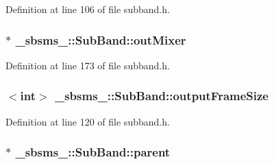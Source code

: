 Definition at line 106 of file subband.\+h.

\subsubsection[{\texorpdfstring{out\+Mixer}{outMixer}}]{$\ast$ \+\_\+sbsms\+\_\+\+::\+Sub\+Band\+::out\+Mixer\hspace{0.3cm}{\ttfamily [protected]}}\hypertarget{class__sbsms___1_1_sub_band_a7abca964a57ef44320053c850ad57803}{}\label{class__sbsms___1_1_sub_band_a7abca964a57ef44320053c850ad57803}


Definition at line 173 of file subband.\+h.

\subsubsection[{\texorpdfstring{output\+Frame\+Size}{outputFrameSize}}]{$<${\bf int}$>$ \+\_\+sbsms\+\_\+\+::\+Sub\+Band\+::output\+Frame\+Size\hspace{0.3cm}{\ttfamily [protected]}}\hypertarget{class__sbsms___1_1_sub_band_a518231d98f7c9c21a33268a24c03a456}{}\label{class__sbsms___1_1_sub_band_a518231d98f7c9c21a33268a24c03a456}


Definition at line 120 of file subband.\+h.

\subsubsection[{\texorpdfstring{parent}{parent}}]{$\ast$ \+\_\+sbsms\+\_\+\+::\+Sub\+Band\+::parent\hspace{0.3cm}{\ttfamily [protected]}}\hypertarget{class__sbsms___1_1_sub_band_a28e9b3ada3b1aa9a7d9b938de935568a}{}\label{class__sbsms___1_1_sub_band_a28e9b3ada3b1aa9a7d9b938de935568a}


